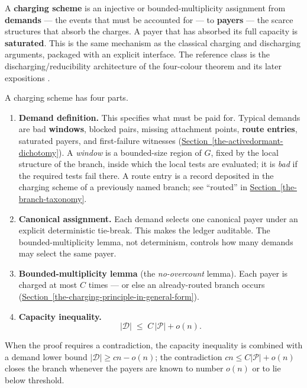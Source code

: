 \documentclass[
  11pt,
]{article}
\providecommand{\tightlist}{%
  \setlength{\itemsep}{0pt}\setlength{\parskip}{0pt}}
\theoremstyle{definition}
\newcommand{\secref}[1]{\hyperref[#1]{Section~\ref*{#1}}}
\begin{document}
A \textbf{charging scheme} is an injective or bounded-multiplicity
assignment from \textbf{demands} --- the events that must be accounted
for --- to \textbf{payers} --- the scarce structures that absorb the
charges. A payer that has absorbed its full capacity is
\textbf{saturated}. This is the same mechanism as the classical charging
and discharging arguments, packaged with an explicit interface. The
reference class is the discharging/reducibility architecture of the
four-colour theorem and its later expositions
\citep{appel-haken-1977-discharging, appel-haken-koch-1977-reducibility, robertson-etal-1997-four-colour, cranston-west-2017-discharging}.

A charging scheme has four parts.

\begin{enumerate}
\def\labelenumi{\arabic{enumi}.}
\tightlist
\item
  \textbf{Demand definition.} This specifies what must be paid for.
  Typical demands are bad \textbf{windows}, blocked pairs, missing
  attachment points, \textbf{route entries}, saturated payers, and
  first-failure witnesses (\secref{the-activedormant-dichotomy}). A \emph{window} is a bounded-size
  region of \(G\), fixed by the local structure of the branch, inside
  which the local tests are evaluated; it is \emph{bad} if the required
  tests fail there. A route entry is a record deposited in the charging
  scheme of a previously named branch; see ``routed'' in \secref{the-branch-taxonomy}.
\item
  \textbf{Canonical assignment.} Each demand selects one canonical payer
  under an explicit deterministic tie-break. This makes the ledger
  auditable. The bounded-multiplicity lemma, not determinism, controls how
  many demands may select the same payer.
\item
  \textbf{Bounded-multiplicity lemma} (the \emph{no-overcount} lemma).
  Each payer is charged at most \(C\) times --- or else an
  already-routed branch occurs (\secref{the-charging-principle-in-general-form}).
\item
  \textbf{Capacity inequality.} \[
  |\mathcal D| \;\le\; C\,|\mathcal P| + o(n).
  \]
\end{enumerate}

When the proof requires a contradiction, the capacity inequality is
combined with a demand lower bound \(|\mathcal D|\ge cn - o(n)\); the
contradiction \(cn \le C|\mathcal P| + o(n)\) closes the branch whenever
the payers are known to number \(o(n)\) or to lie below threshold.
\end{document}

